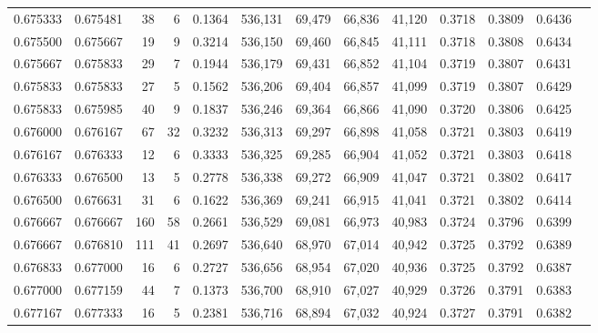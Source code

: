 \begin{tabular}{rrrrrrrrrrrrr}
0.675333 & 0.675481 &    38 &   6 &                                     0.1364 & 536,131 &  69,479 &  66,836 &  41,120 & 0.3718 & 0.3809 & 0.6436 \\
0.675500 & 0.675667 &    19 &   9 &                                     0.3214 & 536,150 &  69,460 &  66,845 &  41,111 & 0.3718 & 0.3808 & 0.6434 \\
0.675667 & 0.675833 &    29 &   7 &                                     0.1944 & 536,179 &  69,431 &  66,852 &  41,104 & 0.3719 & 0.3807 & 0.6431 \\
0.675833 & 0.675833 &    27 &   5 &                                     0.1562 & 536,206 &  69,404 &  66,857 &  41,099 & 0.3719 & 0.3807 & 0.6429 \\
0.675833 & 0.675985 &    40 &   9 &                                     0.1837 & 536,246 &  69,364 &  66,866 &  41,090 & 0.3720 & 0.3806 & 0.6425 \\
0.676000 & 0.676167 &    67 &  32 &                                     0.3232 & 536,313 &  69,297 &  66,898 &  41,058 & 0.3721 & 0.3803 & 0.6419 \\
0.676167 & 0.676333 &    12 &   6 &                                     0.3333 & 536,325 &  69,285 &  66,904 &  41,052 & 0.3721 & 0.3803 & 0.6418 \\
0.676333 & 0.676500 &    13 &   5 &                                     0.2778 & 536,338 &  69,272 &  66,909 &  41,047 & 0.3721 & 0.3802 & 0.6417 \\
0.676500 & 0.676631 &    31 &   6 &                                     0.1622 & 536,369 &  69,241 &  66,915 &  41,041 & 0.3721 & 0.3802 & 0.6414 \\
0.676667 & 0.676667 &   160 &  58 &                                     0.2661 & 536,529 &  69,081 &  66,973 &  40,983 & 0.3724 & 0.3796 & 0.6399 \\
0.676667 & 0.676810 &   111 &  41 &                                     0.2697 & 536,640 &  68,970 &  67,014 &  40,942 & 0.3725 & 0.3792 & 0.6389 \\
0.676833 & 0.677000 &    16 &   6 &                                     0.2727 & 536,656 &  68,954 &  67,020 &  40,936 & 0.3725 & 0.3792 & 0.6387 \\
0.677000 & 0.677159 &    44 &   7 &                                     0.1373 & 536,700 &  68,910 &  67,027 &  40,929 & 0.3726 & 0.3791 & 0.6383 \\
0.677167 & 0.677333 &    16 &   5 &                                     0.2381 & 536,716 &  68,894 &  67,032 &  40,924 & 0.3727 & 0.3791 & 0.6382 \\

\end{tabular}
